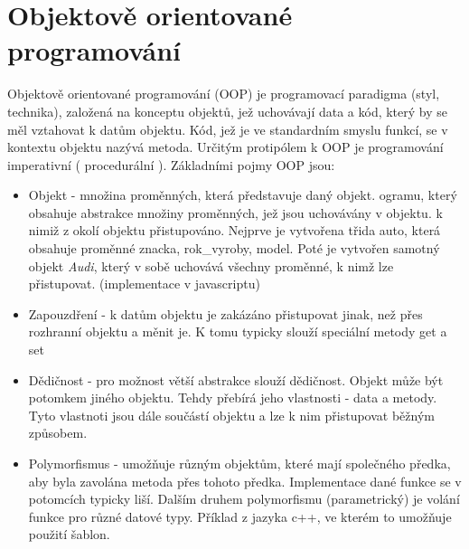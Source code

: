 \documentclass[main.tex]{subfiles}
\begin{document}
\section{Objektově orientované programování}
\label{oop}
Objektově orientované programování (OOP) je programovací paradigma (styl, technika), založená na konceptu objektů, jež uchovávají data a kód, který by se měl vztahovat k datům objektu. Kód, jež je ve standardním smyslu funkcí, se v kontextu objektu nazývá metoda. Určitým protipólem k OOP je programování imperativní ( procedurální ). Základními pojmy OOP jsou:
\begin{itemize}
	\item Objekt - množina proměnných, která představuje daný objekt. ogramu, který obsahuje abstrakce množiny proměnných, jež jsou uchovávány v objektu. k nimiž z okolí objektu přistupováno.
		Nejprve je vytvořena třida auto, která obsahuje proměnné znacka, rok\_vyroby, model. Poté je vytvořen samotný objekt \textit{Audi}, který v sobě uchovává všechny proměnné, k nimž lze přistupovat. (implementace v javascriptu)
	\item Zapouzdření - k datům objektu je zakázáno přistupovat jinak, než přes rozhranní objektu a měnit je. K tomu typicky slouží speciální metody get a set
	\item Dědičnost - pro možnost větší abstrakce slouží dědičnost. Objekt může být potomkem jiného objektu. Tehdy přebírá jeho vlastnosti - data a metody. Tyto vlastnoti jsou dále součástí objektu a lze k nim přistupovat běžným způsobem.
	\item Polymorfismus - umožňuje různým objektům, které mají společného předka, aby byla zavolána metoda přes tohoto předka. Implementace dané funkce se v potomcích typicky liší.
		Dalším druhem polymorfismu (parametrický) je volání funkce pro různé datové typy. Příklad z jazyka c++, ve kterém to umožňuje použití šablon.
\end{itemize}
\end{document}
